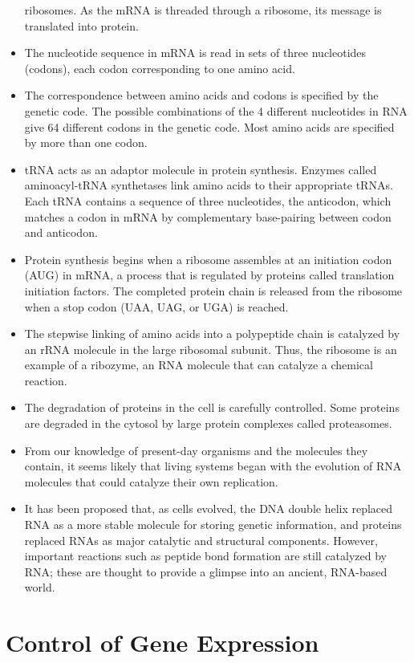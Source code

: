 \begin{itemize}
ribosomes. As the mRNA is threaded through a ribosome, its message
is translated into protein.
\item The nucleotide sequence in mRNA is read in sets of three nucleotides
(codons), each codon corresponding to one amino acid.
\item The correspondence between amino acids and codons is specified
by the genetic code. The possible combinations of the 4 different
nucleotides in RNA give 64 different codons in the genetic code. Most
amino acids are specified by more than one codon.
\item tRNA acts as an adaptor molecule in protein synthesis. Enzymes
called aminoacyl-tRNA synthetases link amino acids to their appropriate
tRNAs. Each tRNA contains a sequence of three nucleotides,
the anticodon, which matches a codon in mRNA by complementary
base-pairing between codon and anticodon.
\item Protein synthesis begins when a ribosome assembles at an initiation
codon (AUG) in mRNA, a process that is regulated by proteins
called translation initiation factors. The completed protein chain is
released from the ribosome when a stop codon (UAA, UAG, or UGA)
is reached.
\item The stepwise linking of amino acids into a polypeptide chain is catalyzed
by an rRNA molecule in the large ribosomal subunit. Thus, the
ribosome is an example of a ribozyme, an RNA molecule that can
catalyze a chemical reaction.
\item The degradation of proteins in the cell is carefully controlled. Some
proteins are degraded in the cytosol by large protein complexes
called proteasomes.
\item From our knowledge of present-day organisms and the molecules
they contain, it seems likely that living systems began with the evolution
of RNA molecules that could catalyze their own replication.
\item It has been proposed that, as cells evolved, the DNA double helix
replaced RNA as a more stable molecule for storing genetic information,
and proteins replaced RNAs as major catalytic and structural
components. However, important reactions such as peptide bond
formation are still catalyzed by RNA; these are thought to provide a
glimpse into an ancient, RNA-based world.
\end{itemize}

\chapter{Control of Gene Expression}

